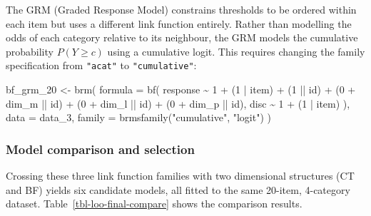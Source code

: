 \documentclass[
  man,
  floatsintext,
  longtable,
  nolmodern,
  notxfonts,
  notimes,
  colorlinks=true,linkcolor=blue,citecolor=blue,urlcolor=blue]{apa7}
\newenvironment{Shaded}{\begin{snugshade}}{\end{snugshade}}
\newcommand{\AttributeTok}[1]{\textcolor[rgb]{0.40,0.45,0.13}{#1}}
\newcommand{\DecValTok}[1]{\textcolor[rgb]{0.68,0.00,0.00}{#1}}
\newcommand{\FunctionTok}[1]{\textcolor[rgb]{0.28,0.35,0.67}{#1}}
\newcommand{\NormalTok}[1]{\textcolor[rgb]{0.00,0.23,0.31}{#1}}
\newcommand{\OtherTok}[1]{\textcolor[rgb]{0.00,0.23,0.31}{#1}}
\newcommand{\SpecialCharTok}[1]{\textcolor[rgb]{0.37,0.37,0.37}{#1}}
\newcommand{\StringTok}[1]{\textcolor[rgb]{0.13,0.47,0.30}{#1}}
\begin{document}
The GRM (Graded Response Model) constrains thresholds to be ordered
within each item but uses a different link function entirely. Rather
than modelling the odds of each category relative to its neighbour, the
GRM models the cumulative probability \(P(Y \geq c)\) using a cumulative
logit. This requires changing the family specification from
\texttt{"acat"} to \texttt{"cumulative"}:

\begin{Shaded}
\begin{Highlighting}[]
\NormalTok{bf\_grm\_20 }\OtherTok{\textless{}{-}} \FunctionTok{brm}\NormalTok{(}
  \AttributeTok{formula =} \FunctionTok{bf}\NormalTok{(}
\NormalTok{    response }\SpecialCharTok{\textasciitilde{}} \DecValTok{1} \SpecialCharTok{+}\NormalTok{ (}\DecValTok{1} \SpecialCharTok{|}\NormalTok{ item) }\SpecialCharTok{+}
\NormalTok{      (}\DecValTok{1} \SpecialCharTok{||}\NormalTok{ id) }\SpecialCharTok{+}\NormalTok{ (}\DecValTok{0} \SpecialCharTok{+}\NormalTok{ dim\_m }\SpecialCharTok{||}\NormalTok{ id) }\SpecialCharTok{+}
\NormalTok{      (}\DecValTok{0} \SpecialCharTok{+}\NormalTok{ dim\_l }\SpecialCharTok{||}\NormalTok{ id) }\SpecialCharTok{+}\NormalTok{ (}\DecValTok{0} \SpecialCharTok{+}\NormalTok{ dim\_p }\SpecialCharTok{||}\NormalTok{ id),}
\NormalTok{    disc }\SpecialCharTok{\textasciitilde{}} \DecValTok{1} \SpecialCharTok{+}\NormalTok{ (}\DecValTok{1} \SpecialCharTok{|}\NormalTok{ item)}
\NormalTok{  ),}
  \AttributeTok{data =}\NormalTok{ data\_3,}
  \AttributeTok{family =} \FunctionTok{brmsfamily}\NormalTok{(}\StringTok{"cumulative"}\NormalTok{, }\StringTok{"logit"}\NormalTok{)}
\NormalTok{)}
\end{Highlighting}
\end{Shaded}

\subsubsection{Model comparison and
selection}\label{model-comparison-and-selection}

Crossing these three link function families with two dimensional
structures (CT and BF) yields six candidate models, all fitted to the
same 20-item, 4-category dataset. Table~\ref{tbl-loo-final-compare}
shows the comparison results.
\end{document}
